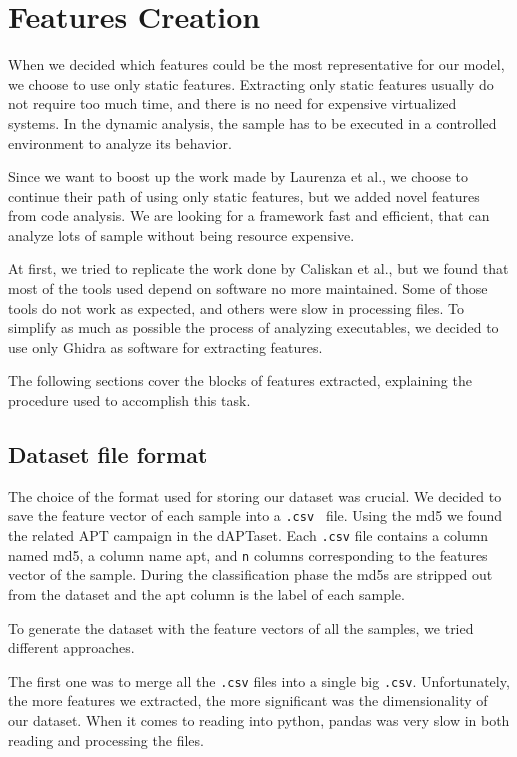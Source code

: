 \chapter{Features Creation}

When we decided which features could be the most representative for our model, we choose to use only static features. Extracting only static features usually do not require too much time, and there is no need for expensive virtualized systems. In the dynamic analysis, the sample has to be executed in a controlled environment to analyze its behavior. 

Since we want to boost up the work made by Laurenza et al., we choose to continue their path of using only static features, but we added novel features from code analysis.  We are looking for a framework fast and efficient, that can analyze lots of sample without being resource expensive.

At first, we tried to replicate the work done by Caliskan et al., but we found that most of the tools used depend on software no more maintained. Some of those tools do not work as expected, and others were slow in processing files. To simplify as much as possible the process of analyzing executables, we decided to use only Ghidra as software for extracting features.

The following sections cover the blocks of features extracted, explaining the procedure used to accomplish this task.

\section{Dataset file format}
The choice of the format used for storing our dataset was crucial.
We decided to save the feature vector of each sample into a \texttt{.csv } file. Using the md5 we found the related APT campaign in the dAPTaset. Each \texttt{.csv} file contains a column named md5, a column name apt, and \texttt{n} columns corresponding to the features vector of the sample. During the classification phase the md5s are stripped out from the dataset and the apt column is the label of each sample.

To generate the dataset with the feature vectors of all the samples, we tried different approaches. 

The first one was to merge all the \texttt{.csv} files into a single big \texttt{.csv}. Unfortunately, the more features we extracted, the more significant was the dimensionality of our dataset.  When it comes to reading into python, pandas was very slow in both reading and processing the files.

